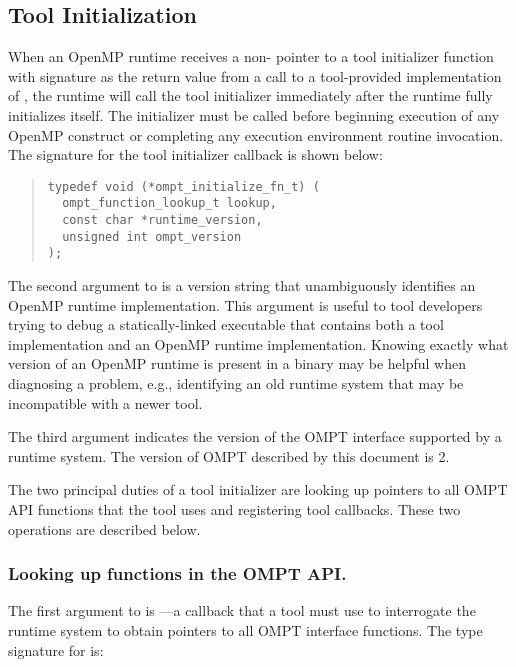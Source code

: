 \subsection{Tool Initialization}
\label{sec:ToolsSupport_init}

When an OpenMP runtime receives a non- pointer to a tool initializer function with signature  as the return value from a call to a tool-provided implementation of , the runtime will call the tool initializer immediately after the runtime fully initializes itself.
The initializer must be called before beginning execution of any OpenMP construct or completing any execution environment routine invocation.
The signature for the tool initializer callback is shown below:

\begin{quote}
\begin{verbatim}
typedef void (*ompt_initialize_fn_t) (
  ompt_function_lookup_t lookup,
  const char *runtime_version, 
  unsigned int ompt_version
);
\end{verbatim}
\end{quote}

The second argument to  is a version string that unambiguously identifies an OpenMP runtime implementation.
This argument is useful to tool developers trying to debug a statically-linked executable that contains both a tool implementation and an OpenMP runtime implementation.
Knowing exactly what version of an OpenMP runtime is present in a binary may be helpful when diagnosing a problem, e.g., identifying an old runtime system that may be incompatible with a newer tool.

The third argument  indicates the version of the OMPT interface supported by a runtime system.
The version of OMPT described by this document is 2.

The two principal duties of a tool initializer are looking up pointers to all OMPT API functions that the tool uses and registering tool callbacks.
These two operations are described below.

\subsubsection{Looking up functions in the OMPT API.}
The first argument to  is ---a callback that a tool must use to interrogate the runtime system to obtain pointers to all OMPT interface functions.
The type signature for  is:

